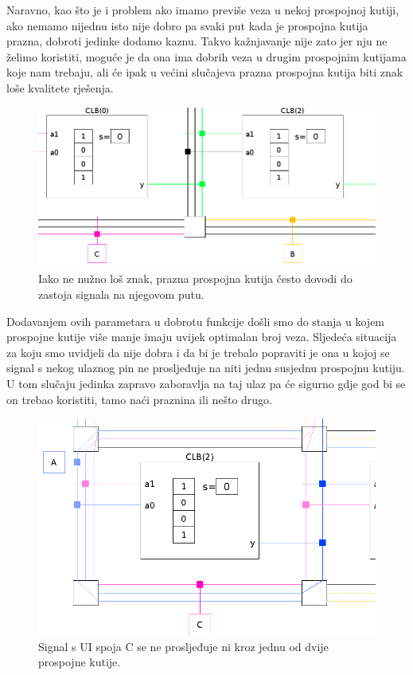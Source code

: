 \documentclass[times, utf8, zavrsni]{fer}
\begin{document}
	Naravno, kao što je i problem ako imamo previše veza u nekoj prospojnoj kutiji, ako nemamo nijednu isto nije dobro pa svaki put kada je prospojna kutija prazna, dobroti jedinke dodamo kaznu. Takvo kažnjavanje nije zato jer nju ne želimo koristiti, moguće je da ona ima dobrih veza u drugim prospojnim kutijama koje nam trebaju, ali će ipak u većini slučajeva prazna prospojna kutija biti znak loše kvalitete rješenja. 
	
	
	\begin{figure}[H]
		\centering
		\includegraphics[width=18cm]{slike/isjecakPraznog.png}
		\caption{Iako ne nužno loš znak, prazna prospojna kutija često dovodi do zastoja signala na njegovom putu.}
		\label{fig:prazna-skatula-isjecak}
	\end{figure} 
	
	Dodavanjem ovih parametara u dobrotu funkcije došli smo do stanja u kojem prospojne kutije više manje imaju uvijek optimalan broj veza. Sljedeća situacija za koju smo uvidjeli da nije dobra i da bi je trebalo popraviti je ona u kojoj se signal s nekog ulaznog pin ne prosljeđuje na niti jednu susjednu prospojnu kutiju. U tom slučaju jedinka zapravo zaboravlja na taj ulaz pa će sigurno gdje god bi se on trebao koristiti, tamo naći praznina ili nešto drugo. 
	
	\begin{figure}[H]
		\centering
		\includegraphics[width=18cm]{slike/isjecakCNikamo.png}
		\caption{Signal s UI spoja C se ne prosljeđuje ni kroz jednu od dvije prospojne kutije. }
		\label{fig:isjecak-c-nikamo}
	\end{figure} 
	
\end{document}
